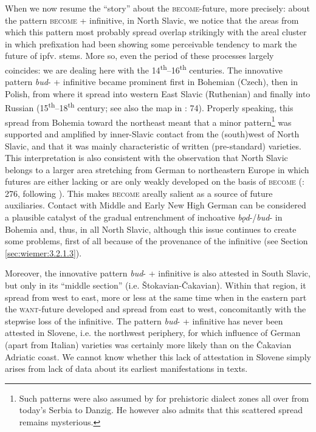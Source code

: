 \documentclass[output=paper,colorlinks,citecolor=brown]{langscibook}
\begin{document}
\largerpage[1.5]

When we now resume the “story” about the \textsc{become}-future, more precisely: about the pattern \textsc{become} + infinitive, in North Slavic, we notice that the areas from which this pattern most probably spread overlap strikingly with the areal cluster in which prefixation had been showing some perceivable tendency to mark the future of ipfv. stems. More so, even the period of these processes largely coincides: we are dealing here with the 14\textsuperscript{th}--16\textsuperscript{th} centuries. The innovative pattern \textit{bud}- + infinitive became prominent first in Bohemian (Czech), then in Polish, from where it spread into western East Slavic (Ruthenian) and finally into Russian (15\textsuperscript{th}--18\textsuperscript{th} century; see also the map in \cite{Whaley2000}: 74). Properly speaking, this spread from Bohemia toward the northeast meant that a minor pattern\footnote{Such patterns were also assumed by \citet[30]{andersen_2006b} for prehistoric dialect zones all over from today's Serbia to Danzig. He however also admits that this scattered spread remains mysterious.} was supported and amplified by inner-Slavic contact from the (south)west of North Slavic, and that it was mainly characteristic of written (pre-standard) varieties. This interpretation is also consistent with the observation that North Slavic belongs to a larger area stretching from German to northeastern Europe in which futures are either lacking or are only weakly developed on the basis of \textsc{become} (\citealt{wiemer_2020}: 276, following \citealt{Dahl2000}). This makes \textsc{become} areally salient as a source of future auxiliaries. Contact with Middle and Early New High German can be considered a plausible catalyst of the gradual entrenchment of inchoative \textit{bǫd}-/\textit{bud}- in Bohemia and, thus, in all North Slavic, although this issue continues to create some problems, first of all because of the provenance of the infinitive (see Section \ref{sec:wiemer:3.2.1.3}). 

Moreover, the innovative pattern \textit{bud}- + infinitive is also attested in South Slavic, but only in its “middle section” (i.e. Štokavian-Čakavian). Within that region, it spread from west to east, more or less at the same time when in the eastern part the \textsc{want}-future developed and spread from east to west, concomitantly with the stepwise loss of the infinitive. The pattern \textit{bud}- + infinitive has never been attested in Slovene, i.e. the northwest periphery, for which influence of German (apart from Italian) varieties was certainly more likely than on the Čakavian Adriatic coast. We cannot know whether this lack of attestation in Slovene simply arises from lack of data about its earliest manifestations in texts.
\end{document}
